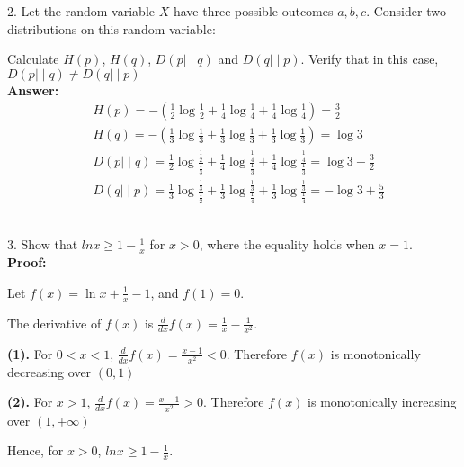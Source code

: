 \documentclass[12pt]{article}
\begin{document}
	\par
	2. Let the random variable $X$ have three possible outcomes {$a,b,c$}. Consider two distributions on this random variable:
	\begin{table}[H]
		\centering
	\end{table}
	Calculate $H(p)$, $H(q)$, $D(p{\mid\mid}q)$ and $D(q{\mid\mid}p)$. Verify that in this case, $D(p{\mid\mid}q)\not=D(q{\mid\mid}p)$ \\
	\textbf{Answer:}
	\begin{align*}
		&H(p) = -(\frac{1}{2}\log\frac{1}{2} + \frac{1}{4}\log\frac{1}{4} + \frac{1}{4}\log\frac{1}{4}) = \frac{3}{2} \\
		&H(q) = -(\frac{1}{3}\log\frac{1}{3} + \frac{1}{3}\log\frac{1}{3} + \frac{1}{3}\log\frac{1}{3}) = \log3 \\
		&D(p{\mid\mid}q) = \frac{1}{2}\log\frac{\frac{1}{2}}{\frac{1}{3}} + \frac{1}{4}\log\frac{\frac{1}{4}}{\frac{1}{3}} + \frac{1}{4}\log\frac{\frac{1}{4}}{\frac{1}{3}} = \log3 - \frac{3}{2} \\
		&D(q{\mid\mid}p) = \frac{1}{3}\log\frac{\frac{1}{3}}{\frac{1}{2}} + \frac{1}{3}\log\frac{\frac{1}{3}}{\frac{1}{4}} + \frac{1}{3}\log\frac{\frac{1}{3}}{\frac{1}{4}} = -\log3+\frac{5}{3}
	\end{align*}
	\\
	\par
	3. Show that $lnx\geq1-\frac{1}{x}$ for $x>0$, where the equality holds when $x=1$. \\
	\textbf{Proof:} \par
	Let $f(x) = \ln x + \frac{1}{x} - 1$, and $f(1) = 0$. \par
	The derivative of $f(x)$ is $\frac{d}{dx}f(x) = \frac{1}{x}-\frac{1}{x^2}$. \par
	\textbf{(1). }For $0<x<1$, $\frac{d}{dx}f(x) = \frac{x-1}{x^2} < 0$. Therefore $f(x)$ is monotonically decreasing over $(0,1)$ \par
	\textbf{(2). }For $x>1$, $\frac{d}{dx}f(x) = \frac{x-1}{x^2} > 0$. Therefore $f(x)$ is monotonically increasing over $(1, +\infty)$ \par
	Hence, for $x>0$, $lnx\geq 1-\frac{1}{x}$.\\
	
\end{document}
